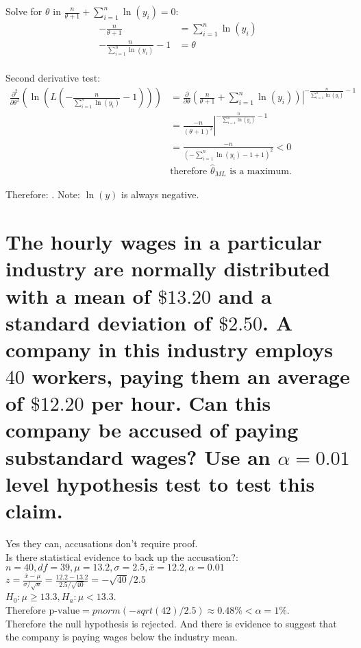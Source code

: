 \documentclass[10pt, letterpaper, titlepage]{article}
\newcommand*\eval[3]{\left.#1\right\rvert_{#2}^{#3}}
\newcommand{\mx}{\overline{x}}
\newcommand{\pv}{\text{p-value}}
\begin{document}
        Solve for $\theta$ in $\frac{n}{\theta+1} + \sum_{i=1}^n \ln(y_i) = 0$:
        \begin{align*}
            -\frac{n}{\theta+1} &= \sum_{i=1}^n \ln(y_i)\\
            -\frac{n}{\sum_{i=1}^n \ln(y_i)} - 1&= \theta\\
        \end{align*}

        Second derivative test:
        \begin{align*}
            \frac{\partial^2}{\partial\theta^2}(\ln(L(-\frac{n}{\sum_{i=1}^n \ln(y_i)} - 1)))
            &= \eval{\frac{\partial}{\partial\theta}(\frac{n}{\theta+1} + \sum_{i=1}^n \ln(y_i))}
            {}{-\frac{n}{\sum_{i=1}^n \ln(y_i)} - 1}\\
            &= \eval{\frac{-n}{(\theta+1)^2}}
            {}{-\frac{n}{\sum_{i=1}^n \ln(y_i)} - 1}\\
            &= \frac{-n}{(-\sum_{i=1}^n \ln(y_i) - 1 + 1)^2} < 0 \\
            &\text{therefore $\hat\theta_{ML}$ is a maximum.}
        \end{align*}

        Therefore: 
        .
        Note: $\ln(y)$ is always negative.

    \newpage
    \section{The hourly wages in a particular industry are normally distributed with a mean of $\$13.20$
        and a standard deviation of $\$2.50$. A company in this industry employs $40$ workers, 
        paying them an average of $\$12.20$ per hour. Can this company be accused of paying 
        substandard wages? Use an $\alpha = 0.01$ level hypothesis test to test this claim.}
        Yes they can, accusations don’t require proof. \\
        Is there statistical evidence to back up the accusation?:\\
        $n = 40, df = 39, \mu = 13.2, \sigma = 2.5, \mx = 12.2, \alpha = 0.01$\\
        $z = \frac{\mx - \mu}{\sigma / \sqrt{n}} = \frac{12.2-13.2}{2.5 / \sqrt{40}}
        = - \sqrt{40} / 2.5$\\
        $H_0: \mu \geq 13.3, H_a: \mu < 13.3$.\\
        Therefore $\pv =  pnorm(-sqrt(42) / 2.5) \approx 0.48\% < \alpha = 1\%$.\\
        Therefore the null hypothesis is rejected. And there is evidence to suggest that
        the company is paying wages below the industry mean.
\end{document}

